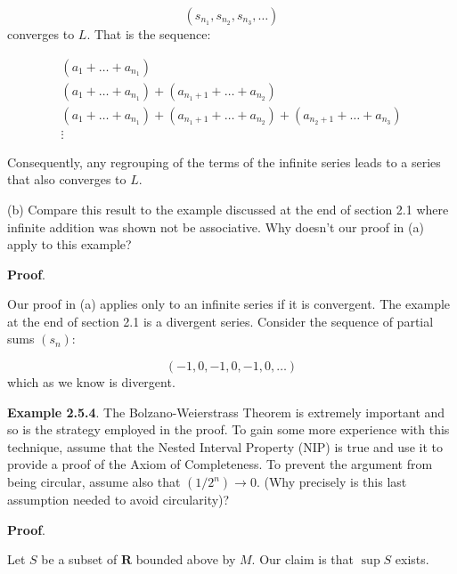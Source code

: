 \documentclass[10pt]{article}
\begin{document}
\begin{equation*}
( s_{n_{1}} ,s_{n_{2}} ,s_{n_{3}} ,\dotsc )
\end{equation*}
converges to $\displaystyle L$. That is the sequence:


\begin{equation*}
\begin{array}{ l }
( a_{1} +\dotsc +a_{n_{1}})\\
( a_{1} +\dotsc +a_{n_{1}}) +( a_{n_{1} +1} +\dotsc +a_{n_{2}})\\
( a_{1} +\dotsc +a_{n_{1}}) +( a_{n_{1} +1} +\dotsc +a_{n_{2}}) +( a_{n_{2} +1} +\dotsc +a_{n_{3}})\\
\vdots 
\end{array}
\end{equation*}


Consequently, any regrouping of the terms of the infinite series leads to a series that also converges to $\displaystyle L$.



(b) Compare this result to the example discussed at the end of section 2.1 where infinite addition was shown not be associative. Why doesn't our proof in (a) apply to this example?



\textbf{Proof}.



Our proof in (a) applies only to an infinite series if it is convergent. The example at the end of section 2.1 is a divergent series. Consider the sequence of partial sums $\displaystyle ( s_{n})$:


\begin{equation*}
( -1,0,-1,0,-1,0,\dotsc )
\end{equation*}
which as we know is divergent.



\textbf{Example 2.5.4}. The Bolzano-Weierstrass Theorem is extremely important and so is the strategy employed in the proof. To gain some more experience with this technique, assume that the Nested Interval Property (NIP) is true and use it to provide a proof of the Axiom of Completeness. To prevent the argument from being circular, assume also that $\displaystyle \left( 1/2^{n}\right)\rightarrow 0$. (Why precisely is this last assumption needed to avoid circularity)? 



\textbf{Proof}.

Let $\displaystyle S$ be a subset of $\displaystyle \mathbf{R}$ bounded above by $\displaystyle M$. Our claim is that $\displaystyle \sup S$ exists. 
\end{document}
